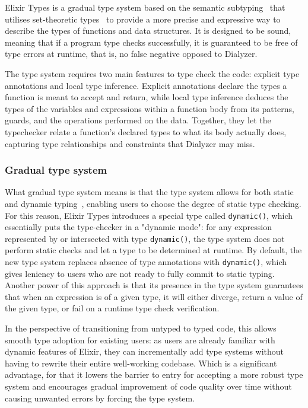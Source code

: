 Elixir Types is a gradual type system based on the semantic subtyping~\cite{frisch2008semantic} that utilises set-theoretic types~\cite{duboc2024} to provide a more precise and expressive way to describe the types of functions and data structures.
It is designed to be sound, meaning that if a program type checks successfully, it is guaranteed to be free of type errors at runtime, that is, no false negative opposed to Dialyzer.

The type system requires two main features to type check the code: explicit type annotations and local type inference.
Explicit annotations declare the types a function is meant to accept and return, while local type inference deduces the types of the variables and expressions within a function body from its patterns, guards, and the operations performed on the data.
Together, they let the typechecker relate a function's declared types to what its body actually does, capturing type relationships and constraints that Dialyzer may miss.

\subsubsection{Gradual type system}
\label{sec:gradual-type-system}

What gradual type system means is that the type system allows for both static and dynamic typing~\cite{siek2006gradual}, enabling users to choose the degree of static type checking.
For this reason, Elixir Types introduces a special type called \texttt{dynamic()}, which essentially puts the type-checker in a "dynamic mode": for any expression represented by or intersected with type \texttt{dynamic()}, the type system does not perform static checks and let a type to be determined at runtime.
By default, the new type system replaces absence of type annotations with \texttt{dynamic()}, which gives leniency to users who are not ready to fully commit to static typing.
Another power of this approach is that its presence in the type system guarantees that when an expression is of a given type, it will either diverge, return a value of the given type, or fail on a runtime type check verification.

In the perspective of transitioning from untyped to typed code, this allows smooth type adoption for existing users: as users are already familiar with dynamic features of Elixir, they can incrementally add type systems without having to rewrite their entire well-working codebase.
Which is a significant advantage, for that it lowers the barrier to entry for accepting a more robust type system and encourages gradual improvement of code quality over time without causing unwanted errors by forcing the type system.

